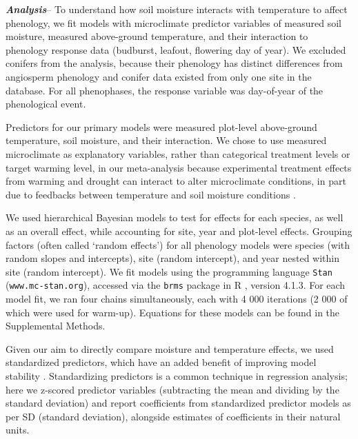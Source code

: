 \documentclass{article}
\begin{document}
\par\textbf {\emph{Analysis}}--
To understand how soil moisture interacts with temperature to affect phenology, we fit models with microclimate predictor variables of measured soil moisture, measured above-ground temperature, and their interaction to phenology response data (budburst, leafout, flowering day of year). We excluded conifers from the analysis, because their phenology has distinct differences from angiosperm phenology \cite{polgar2014} and conifer data existed from only one site in the database. For all phenophases, the response variable was day-of-year of the phenological event. 
\par Predictors for our primary models were measured plot-level above-ground temperature, soil moisture, and their interaction. We chose to use measured microclimate as explanatory variables, rather than categorical treatment levels or target warming level, in our meta-analysis because experimental treatment effects from warming and drought can interact to alter microclimate conditions, in part due to feedbacks between temperature and soil moisture conditions \citep{ettinger2019,mcdaniel2014}.
 
\par We used hierarchical Bayesian models to test for effects for each species, as well as an overall effect, while accounting for site, year and plot-level effects. Grouping factors (often called `random effects') for all phenology models were species (with random slopes and intercepts), site (random intercept), and year nested within site (random intercept). We fit models using the programming language \texttt{Stan} \citep{Carpenter:2016aa} (\texttt{www.mc-stan.org}), accessed via the \texttt{brms} \citep{burkner2021} package in R \citep{rcoreteam2022}, version 4.1.3. For each model fit, we ran four chains simultaneously, each with 4 000 iterations (2 000 of which were used for warm-up). Equations for these models can be found in the Supplemental Methods. 

\par Given our aim to directly compare moisture and temperature effects, we used standardized predictors, which have an added benefit of improving model stability \citep{gelman2007}. Standardizing predictors is a common technique in regression analysis; here we z-scored predictor variables (subtracting the mean and dividing by the standard deviation) and report coefficients from standardized predictor models as per SD (standard deviation), alongside estimates of coefficients in their natural units. 
\end{document}
